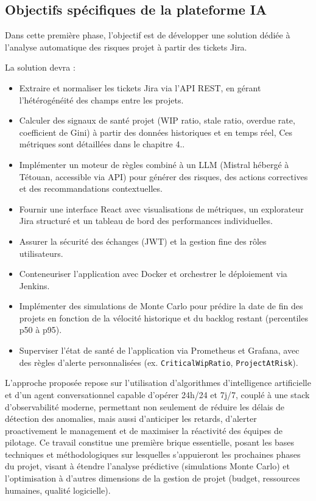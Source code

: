 \subsection{Objectifs spécifiques de la plateforme IA}

Dans cette première phase, l’objectif est de développer une solution dédiée à l’analyse automatique des risques projet à partir des tickets Jira.

La solution devra :

\begin{itemize}
    \renewcommand{\labelitemi}{—}
    \item Extraire et normaliser les tickets Jira via l’API REST, en gérant l’hétérogénéité des champs entre les projets.
    \item Calculer des signaux de santé projet (WIP ratio, stale ratio, overdue rate, coefficient de Gini) à partir des données historiques et en temps réel, Ces métriques sont détaillées dans le chapitre 4..
    \item Implémenter un moteur de règles combiné à un LLM (Mistral hébergé à Tétouan, accessible via API) pour générer des risques, des actions correctives et des recommandations contextuelles.
    \item Fournir une interface React avec visualisations de métriques, un explorateur Jira structuré et un tableau de bord des performances individuelles.
    \item Assurer la sécurité des échanges (JWT) et la gestion fine des rôles utilisateurs.
    \item Conteneuriser l’application avec Docker et orchestrer le déploiement via Jenkins.
    \item Implémenter des simulations de Monte Carlo pour prédire la date de fin des projets en fonction de la vélocité historique et du backlog restant (percentiles p50 à p95).
    \item Superviser l’état de santé de l’application via Prometheus et Grafana, avec des règles d’alerte personnalisées (ex. \texttt{CriticalWipRatio}, \texttt{ProjectAtRisk}).
\end{itemize}

L’approche proposée repose sur l’utilisation d’algorithmes d’intelligence artificielle et d’un agent conversationnel capable d’opérer 24h/24 et 7j/7, couplé à une stack d’observabilité moderne, permettant non seulement de réduire les délais de détection des anomalies, mais aussi d’anticiper les retards, d’alerter proactivement le management et de maximiser la réactivité des équipes de pilotage.
Ce travail constitue une première brique essentielle, posant les bases techniques et méthodologiques sur lesquelles s’appuieront les prochaines phases du projet, visant à étendre l’analyse prédictive (simulations Monte Carlo) et l’optimisation à d’autres dimensions de la gestion de projet (budget, ressources humaines, qualité logicielle).

